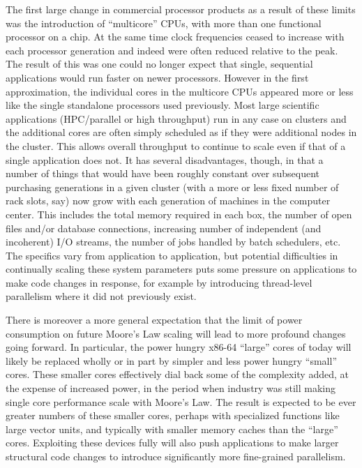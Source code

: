 The first large change in commercial processor products as a
result of these limits was the introduction of ``multicore'' CPUs,
with more than one functional processor on a chip. At the same time
clock frequencies ceased to increase with each processor generation and
indeed were often reduced relative to the peak. The result of this was
one could no longer expect that single, sequential applications would
run faster on newer processors. However in the first approximation,
the individual cores in the multicore CPUs appeared more or less
like the single standalone processors used previously. Most large
scientific applications (HPC/parallel or high throughput) run in
any case on clusters and the additional cores are often simply
scheduled as if they were additional nodes in the cluster. This
allows overall throughput to continue to scale even if that of a
single application does not. It has several disadvantages, though,
in that a number of things that would have been roughly constant
over subsequent purchasing generations in a given cluster (with
a more or less fixed number of rack slots, say) now grow with each
generation of machines in the computer center. This includes the
total memory required in each box, the number of open files and/or
database connections, increasing number of independent (and incoherent)
I/O streams, the number of jobs handled by batch schedulers,
etc.  The specifics vary from application to application, but
potential difficulties in continually scaling these system parameters
puts some pressure on applications to make code changes in response,
for example by introducing thread-level parallelism where it did
not previously exist.

There is moreover a more general expectation that the limit of power
consumption on future Moore's Law scaling will lead to more profound
changes going forward. In particular, the power hungry x86-64
``large'' cores of today will likely be replaced wholly or in part by
simpler and less power hungry ``small'' cores. These smaller cores
effectively dial back some of the complexity added, at the expense of
increased power, in the period when industry was still making single
core performance scale with Moore's Law.  The result is expected to be
ever greater numbers of these smaller cores, perhaps with specialized
functions like large vector units, and typically with smaller memory
caches than the ``large'' cores.  Exploiting these devices fully will
also push applications to make larger structural code changes to
introduce significantly more fine-grained parallelism.

